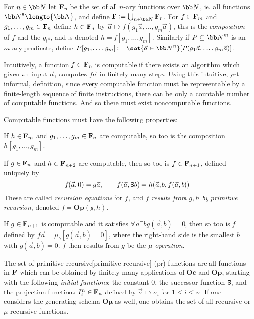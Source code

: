 For $n\in{\bb N}$ let ${\bf F}_n$ be the set of all $n$-ary functions over ${\bb N}$, ie. all functions ${\bb N}^n\longto{\bb N}$, and define
${\bf F}\coloneqq\bigcup_{n\in{\bb N}}{\bf F}_n$.
For $f\in{\bf F}_m$ and $g_1,\dots,g_m\in{\bf F}_n$ define $h\in{\bf F}_n$ by $\vec a\mapsto f(g_1\vec a,\dots,g_m\vec a)$, this is the
{\it composition} of $f$ and the $g_i$s, and is denoted $h=f[g_1,\dots,g_m]$.
Similarly if $P\subseteq{\bb N}^m$ is an $m$-ary predicate, define $P[g_1,\dots,g_m]\coloneqq\set{\vec a\in{\bb N}^n}[P(g_1\vec a,\dots,g_m\vec a)]$.

Intuitively, a function $f\in{\bf F}_n$ is computable if there exists an algorithm which given an input $\vec a$, computes $f\vec a$ in finitely many
steps.
Using this intuitive, yet informal, definition, since every computable function must be representable by a finite-length sequence of finite
instructions, there can be only a countable number of computable functions.
And so there must exist noncomputable functions.

Computable functions must have the following properties:

\blist
    \item[$\boldsymbol{Oc}$:] If $h\in{\bf F}_m$ and $g_1,\dots,g_m\in{\bf F}_n$ are computable, so too is the composition $h[g_1,\dots,g_m]$.
    \item[$\boldsymbol{Op}$:] If $g\in{\bf F}_n$ and $h\in{\bf F}_{n+2}$ are computable, then so too is $f\in{\bf F}_{n+1}$, defined uniquely by
    $$ f(\vec a,0) = g\vec a,\qquad f(\vec a,{\tt S}b) = h(\vec a,b,f(\vec a,b)) $$
    These are called {\it recursion equations} for $f$, and $f$ {\it results from $g,h$ by primitive recursion}, denoted $f=\boldsymbol{Op}(g,h)$.
    \item[$\boldsymbol{O\mu}$:] If $g\in{\bf F}_{n+1}$ is computable and it satisfies $\forall\vec a\exists bg(\vec a,b)=0$, then so too is $f$ defined
    by $f\vec a=\mu_b[g(\vec a,b)=0]$, where the right-hand side is the smallest $b$ with $g(\vec a,b)=0$.
    $f$ then results from $g$ be the {\it $\mu$-operation}.
\elist

\bdefn

    The set of {\emphcolor primitive recursive}[primitive recursive] (pr) functions are all functions in ${\bf F}$ which
    can be obtained by finitely many applications of $\boldsymbol{Oc}$ and $\boldsymbol{Op}$, starting with the following {\it initial functions}: the
    constant $0$, the successor function ${\tt S}$, and the projection functions $I^n_i\in{\bf F}_n$ defined by $\vec a\mapsto a_i$ for $1\leq i\leq n$.
    If one considers the generating schema $\boldsymbol{O\mu}$ as well, one obtains the set of all {\emphcolor recursive}%
     or {\emphcolor $\mu$-recursive} functions.

